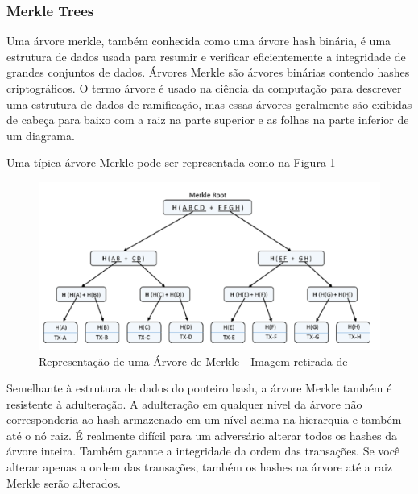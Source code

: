         \subsubsection{Merkle Trees}
  
            Uma árvore merkle, também conhecida como uma árvore hash binária, é uma estrutura de dados usada para resumir e verificar eficientemente a integridade de grandes conjuntos de dados. Árvores Merkle são árvores binárias contendo hashes criptográficos. O termo árvore é usado na ciência da computação para descrever uma estrutura de dados de ramificação, mas essas árvores geralmente são exibidas de cabeça para baixo com a raiz na parte superior e as folhas na parte inferior de um diagrama.\cite{mastering_blockchain_andreas}
            
            Uma típica árvore Merkle pode ser representada como na Figura \ref{fig:merkle_tree_representation}
        
                \begin{figure}[H]
                     \centering
                     \includegraphics[scale=0.7]{figuras/capitulo_2/merkle_tree_representation.png}
                     \caption{Representação de uma Árvore de Merkle - Imagem retirada de \cite{beginnig_blockchain_bikramaditya}}
                     \label{fig:merkle_tree_representation}
                \end{figure}

            Semelhante à estrutura de dados do ponteiro hash, a árvore Merkle também é resistente à adulteração. A adulteração em qualquer nível da árvore não corresponderia ao hash armazenado em um nível acima na hierarquia e também até o nó raiz. É realmente difícil para um adversário alterar todos os hashes da árvore inteira. Também garante a integridade da ordem das transações. Se você alterar apenas a ordem das transações, também os hashes na árvore até a raiz Merkle serão alterados.\cite{beginnig_blockchain_bikramaditya}


